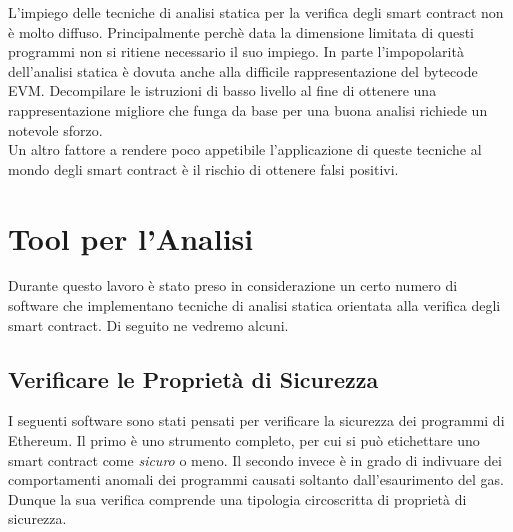 L'impiego delle tecniche di analisi statica per la verifica degli smart contract non è molto diffuso. Principalmente perchè data la dimensione limitata di questi programmi non si ritiene necessario il suo impiego.\newline
\indent In parte l'impopolarità dell'analisi statica è dovuta anche alla difficile rappresentazione del bytecode EVM. Decompilare le istruzioni di basso livello al fine di ottenere una rappresentazione migliore che funga da base per una buona analisi richiede un notevole sforzo.\\
\indent Un altro fattore a rendere poco appetibile l'applicazione di queste tecniche al mondo degli smart contract è il rischio di ottenere falsi positivi.\newline

\section{Tool per l'Analisi}
Durante questo lavoro è stato preso in considerazione un certo numero di software che implementano tecniche di analisi statica orientata alla verifica degli smart contract. Di seguito ne vedremo alcuni.

\subsection{Verificare le Proprietà di Sicurezza}

I seguenti software sono stati pensati per verificare la sicurezza dei programmi di Ethereum.\newline
\indent Il primo è uno strumento completo, per cui si può etichettare uno smart contract come \emph{sicuro} o meno. Il secondo invece è in grado di indivuare dei comportamenti anomali dei programmi causati soltanto dall'esaurimento del gas. Dunque la sua verifica comprende una tipologia circoscritta di proprietà di sicurezza.\newline

